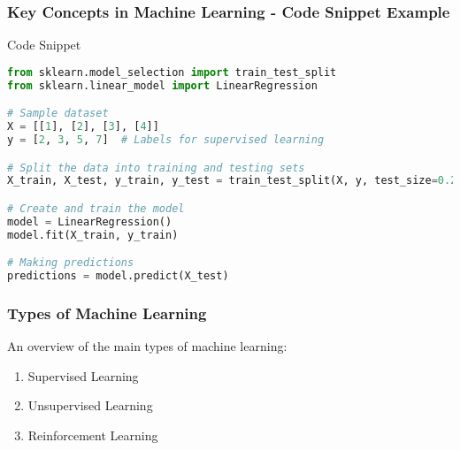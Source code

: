 \documentclass[aspectratio=169]{beamer}
\begin{document}
\begin{frame}[fragile]
    \frametitle{Key Concepts in Machine Learning - Code Snippet Example}
    \begin{block}{Code Snippet}
    \begin{lstlisting}[language=Python]
from sklearn.model_selection import train_test_split
from sklearn.linear_model import LinearRegression

# Sample dataset
X = [[1], [2], [3], [4]]
y = [2, 3, 5, 7]  # Labels for supervised learning

# Split the data into training and testing sets
X_train, X_test, y_train, y_test = train_test_split(X, y, test_size=0.25, random_state=42)

# Create and train the model
model = LinearRegression()
model.fit(X_train, y_train)

# Making predictions
predictions = model.predict(X_test)
    \end{lstlisting}
    \end{block}
\end{frame}

\begin{frame}[fragile]
    \frametitle{Types of Machine Learning}
    An overview of the main types of machine learning:
    \begin{enumerate}
        \item Supervised Learning
        \item Unsupervised Learning
        \item Reinforcement Learning
    \end{enumerate}
\end{frame}
\end{document}
